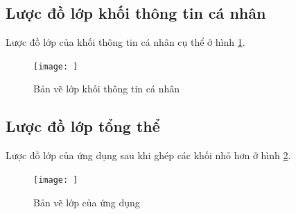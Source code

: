 \documentclass[a4paper]{article}
\begin{document}
\subsection{Lược đồ lớp khối thông tin cá nhân}
Lược đồ lớp của khối thông tin cá nhân cụ thể ở hình \ref{fig:uml_info}.
\begin{figure}[h]
    \centering
    \texttt{[image: ]}
    \caption{Bản vẽ lớp khối thông tin cá nhân}
    \label{fig:uml_info}
\end{figure}
\subsection{Lược đồ lớp tổng thể}
Lược đồ lớp của ứng dụng sau khi ghép các khối nhỏ hơn ở hình \ref{fig:uml_all}.
\begin{figure}[H]
    \centering
    \texttt{[image: ]}
    \caption{Bản vẽ lớp của ứng dụng}
    \label{fig:uml_all}
\end{figure}
\end{document}
